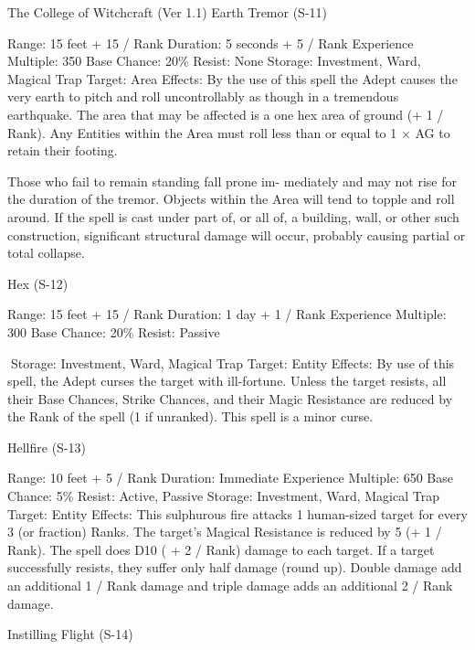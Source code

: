 \begin{Chapter}{The College of Witchcraft (Ver 1.1)}
Earth Tremor (S-11) 

Range: 15 feet + 15 / Rank 
Duration: 5 seconds + 5 / Rank 
Experience Multiple: 350 
Base Chance: 20\% 
Resist: None 
Storage: Investment, Ward, Magical Trap 
Target: Area 
Effects:  By  the  use  of  this  spell  the  Adept  causes 
the  very  earth  to  pitch  and  roll  uncontrollably  as 
though  in  a  tremendous  earthquake.  The  area  that 
may be affected is a one hex area of ground (+ 1 / 
Rank). Any Entities within the Area  must roll less 
than or equal to 1 × AG to retain their footing. 

Those  who  fail  to  remain  standing  fall  prone  im-
mediately  and may  not  rise  for  the  duration  of the 
tremor. Objects within the Area will tend to topple 
and roll around. If the spell is cast under part of, or 
all of, a building, wall,  or other such construction, 
significant  structural  damage  will  occur,  probably 
causing partial or total collapse. 

Hex (S-12) 

Range: 15 feet + 15 / Rank 
Duration: 1 day + 1 / Rank 
Experience Multiple: 300 
Base Chance: 20\% 
Resist: Passive 

Storage: Investment, Ward, Magical Trap 
Target: Entity 
Effects:  By  use  of  this  spell,  the  Adept  curses  the 
target with ill-fortune. Unless the target resists, all 
their  Base  Chances,  Strike  Chances,  and  their 
Magic  Resistance  are  reduced  by  the  Rank  of  the 
spell (1 if unranked). This spell is a minor curse. 

Hellfire (S-13) 

Range: 10 feet + 5 / Rank 
Duration: Immediate 
Experience Multiple: 650 
Base Chance: 5\% 
Resist: Active, Passive 
Storage: Investment, Ward, Magical Trap 
Target: Entity 
Effects: This sulphurous fire attacks 1 human-sized 
target for every 3 (or fraction) Ranks. The target’s 
Magical  Resistance  is  reduced  by  5  (+  1  /  Rank). 
The  spell  does  D10  (  +  2  /  Rank)  damage  to  each 
target.  If  a  target  successfully  resists,  they  suffer 
only  half  damage  (round  up).  Double  damage  add 
an  additional  1  /  Rank  damage  and  triple  damage 
adds an additional 2 / Rank damage. 

Instilling Flight (S-14) 


\end{Chapter}
